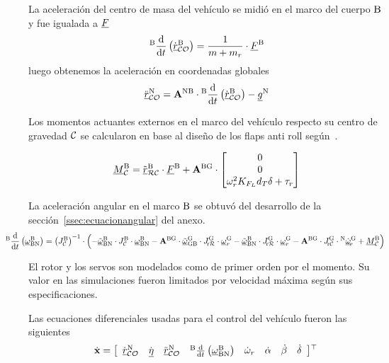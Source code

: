 La aceleración del centro de masa del vehículo se midió en el marco del cuerpo $\mathrm{B}$ y fue igualada a  ${ \underline{F} }$
\begin{equation}
	{}^{\mathrm{B}}\frac{\textrm{d} }{\textrm{d} t}\left( \dot{{ \underline{r} }}_{\mathcal{CO}}^{\mathrm{B}} \right) = \frac{1}{m+m_r} \cdot { \underline{F} }^{\mathrm{B}}
\end{equation}
luego obtenemos la aceleración en coordenadas globales
\begin{equation}
	\ddot{{ \underline{r} }}_{\mathcal{CO}}^{\mathrm{N}} =
	\mathbf{A}^{\mathrm{NB}}\cdot {}^{\mathrm{B}}\frac{\textrm{d} }{\textrm{d} t}\left( \dot{{ \underline{r} }}_{\mathcal{CO}}^{\mathrm{B}} \right)- { \underline{g} }^{\mathrm{N}}
\end{equation}

Los momentos actuantes externos en el marco del vehículo respecto su centro de gravedad $\mathcal{C}$ se calcularon en base al diseño de los flaps anti roll según~\cite{romarowski2020edf}.

\begin{equation}
	{ \underline{M} }^{\mathrm{B}}_{\mathcal{C}} = \tilde{{ \underline{r} }}_{\mathcal{RC}}^{\mathrm{B}}\cdot { \underline{F} }^{\mathrm{B}} + \mathbf{A}^{\mathrm{BG}} \cdot 
	\begin{bmatrix}
		0 \\
		0 \\
		\omega_r^2 K_{F_L}d_T\delta+\tau_r
	\end{bmatrix}  
\end{equation}

La aceleración angular en el marco $\mathrm{B}$ se obtuvó del desarrollo de la sección~\ref{ssec:ecuacionangular} del anexo.
\begin{equation}
	\hspace{-1cm}
{}^\frm{B}\frac{\di }{\di t} \left(\avec{\omega}_\frm{BN}^\frm{B} \right) =  \left(\inertia{C}{B}\right)^{-1} \cdot \left( - \skw{\avec{\omega}}_\frm{BN}^\frm{B} \cdot \inertia{C}{B}\cdot \avec{\omega}_{\frm{BN}}^{\frm{B}} - 
\transform{{BG}} \cdot\skw{\avec{\omega}}_\frm{GB}^\frm{G} \cdot \inertiarotor{R}{G}  \cdot \avec{\omega}_r^\frm{G} -
\skw{\avec{\omega}}_\frm{BN}^\frm{B} \cdot \inertiarotor{R}{G}  \cdot \avec{\omega}_r^\frm{G} -
\transform{{BG}}\cdot  \inertiarotor{C}{G} \cdot  {}^\frm{N} \dot{\avec{\omega}}_{\!r}^{\frm{G}} + \avec{M}_\ogn{C}^\frm{B} \right)
\end{equation}

El rotor y los servos son modelados como de primer orden por el momento. Su valor en las simulaciones fueron limitados por velocidad máxima según sus especificaciones.

Las ecuaciones diferenciales usadas para el control del vehículo fueron las siguientes
\begin{equation} \label{eq:ssDiffVariables3D}
	\dot{\mathbf{x}} = \left[
	\begin{array}{cccccccc}
		\dot{{ \underline{r} }}_{\mathcal{CO}}^{\mathrm{N}}& \dot{{ \underline{\eta} }} &\ddot{{ \underline{r} }}_{\mathcal{CO}}^{\mathrm{N}} & {}^{\mathrm{B}}\frac{\textrm{d} }{\textrm{d} t} \left({ \underline{\omega} }_{\mathrm{BN}}^{\mathrm{B}} \right) & \dot{\omega}_r & \dot{\alpha} & \dot{\beta} & \dot{\delta}
	\end{array}\right] \!^{\top}\!~
\end{equation}


